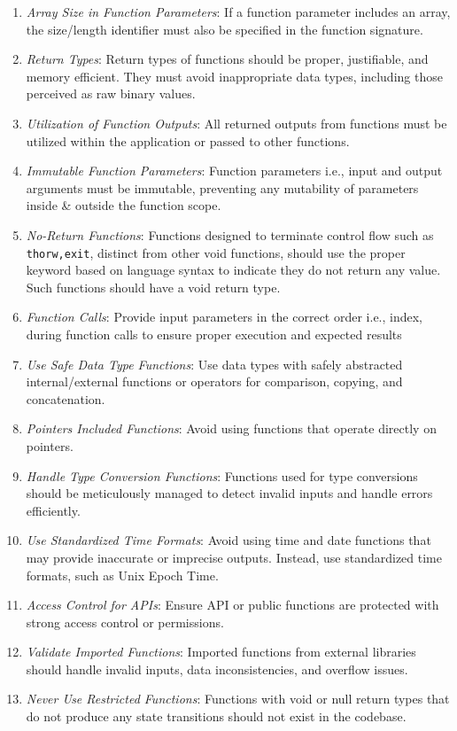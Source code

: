\documentclass[9pt]{IEEEtran} %
\begin{document}
\begin{enumerate}
  \item \textit{Array Size in Function Parameters}: If a function parameter includes an array, the size/length identifier must also be specified in the function signature.
  \item \textit{Return Types}: Return types of functions should be proper, justifiable, and memory efficient. They must avoid inappropriate data types, including those perceived as raw binary values.
  \item \textit{Utilization of Function Outputs}: All returned outputs from functions must be utilized within the application or passed to other functions.
  \item \textit{Immutable Function Parameters}: Function parameters i.e., input and output arguments must be immutable, preventing any mutability of parameters inside \& outside the function scope.
  \item \textit{No-Return Functions}: Functions designed to terminate control flow such as \texttt{thorw,exit}, distinct from other void functions, should use the proper keyword based on language syntax to indicate they do not return any value. Such functions should have a void return type.
  \item \textit{Function Calls}: Provide input parameters in the correct order i.e., index, during function calls to ensure proper execution and expected results
  \item \textit{Use Safe Data Type Functions}: Use data types with safely abstracted internal/external functions or operators for comparison, copying, and concatenation. 
  \item \textit{Pointers Included Functions}: Avoid using functions that operate directly on pointers.
  \item \textit{Handle Type Conversion Functions}: Functions used for type conversions should be meticulously managed to detect invalid inputs and handle errors efficiently.
  \item \textit{Use Standardized Time Formats}: Avoid using time and date functions that may provide inaccurate or imprecise outputs. Instead, use standardized time formats, such as Unix Epoch Time.
  \item \textit{Access Control for APIs}: Ensure API or public functions are protected with strong access control or permissions.
  \item \textit{Validate Imported Functions}: Imported functions from external libraries should handle invalid inputs, data inconsistencies, and overflow issues.
  \item \textit{Never Use Restricted Functions}: Functions with void or null return types that do not produce any state transitions should not exist in the codebase.

\end{enumerate}
\end{document}

